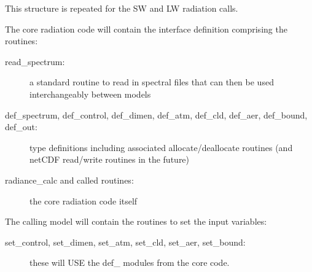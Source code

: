 This structure is repeated for the SW and LW radiation calls.

The core radiation code will contain the interface definition comprising the routines:

\begin{description}
\item[read\_spectrum:] a standard routine to read in spectral files that can then be used interchangeably between models
\item[def\_spectrum, def\_control, def\_dimen, def\_atm, def\_cld, def\_aer, def\_bound, def\_out:] type definitions including associated allocate/deallocate routines (and netCDF read/write routines in the future)
\item[radiance\_calc and called routines:] the core radiation code itself
\end{description}

The calling model will contain the routines to set the input variables:

\begin{description}
\item[set\_control, set\_dimen, set\_atm, set\_cld, set\_aer, set\_bound:] these will USE the def\_ modules from the core code.
\end{description}
